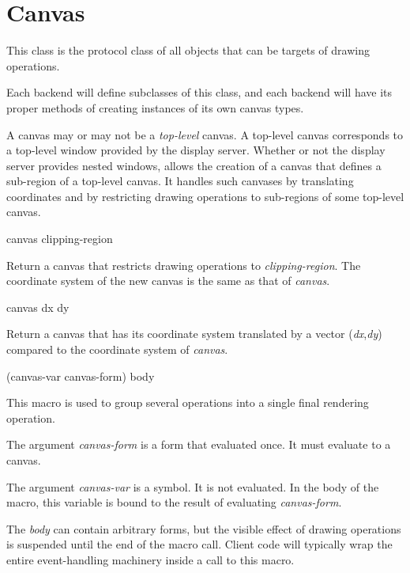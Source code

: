 \chapter{Canvas}
\label{chap-canvas}


This class is the protocol class of all objects that can be targets of
drawing operations.

Each backend will define subclasses of this class, and each backend
will have its proper methods of creating instances of its own canvas
types.

A canvas may or may not be a \emph{top-level} canvas.  A top-level
canvas corresponds to a top-level window provided by the display
server.  Whether or not the display server provides nested windows,
\sysname{} allows the creation of a canvas that defines a sub-region
of a top-level canvas.  It handles such canvases by translating
coordinates and by restricting drawing operations to sub-regions of
some top-level canvas.

 {canvas clipping-region}

Return a canvas that restricts drawing operations to
\textit{clipping-region}.  The coordinate system of the new canvas is
the same as that of \textit{canvas}.

 {canvas dx dy}

Return a canvas that has its coordinate system translated by a vector
(\textit{dx},\textit{dy}) compared to the coordinate system of
\textit{canvas}.%

 {(canvas-var canvas-form) \body body}

This macro is used to group several operations into a single final
rendering operation.

The argument \textit{canvas-form} is a form that evaluated once.  It
must evaluate to a canvas.

The argument \textit{canvas-var} is a symbol.  It is not evaluated.
In the body of the macro, this variable is bound to the result of
evaluating \textit{canvas-form}.

The \textit{body} can contain arbitrary forms, but the visible effect
of drawing operations is suspended until the end of the macro call.
Client code will typically wrap the entire event-handling machinery
inside a call to this macro.
